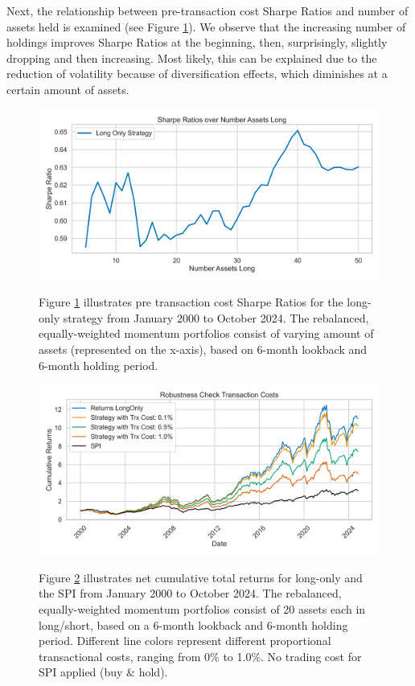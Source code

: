 \documentclass[a4paper,12pt]{article}
\begin{document}
Next, the relationship between pre-transaction cost Sharpe Ratios and number of assets held is examined (see Figure \ref{fig_04}). We observe that the increasing number of holdings improves Sharpe Ratios at the beginning, then, surprisingly, slightly dropping and then increasing. Most likely, this can be explained due to the reduction of volatility because of diversification effects, which diminishes at a certain amount of assets. 
\begin{figure}[htbp]
\centerline{\includegraphics[width=1\textwidth]{figures/rc_number_assets.png}}
\caption{}
\label{fig_04}
\small{{Figure \ref{fig_04} illustrates pre transaction cost Sharpe Ratios for the long-only strategy from January 2000 to October 2024. The rebalanced, equally-weighted momentum portfolios consist of varying amount of assets (represented on the x-axis), based on 6-month lookback and 6-month  holding period.}}
\end{figure}


\begin{figure}[htbp]
\centerline{\includegraphics[width=1\textwidth]{figures/rc_trxCost.png}}
\caption{}
\label{fig_05}
\small{{Figure \ref{fig_05} illustrates net cumulative total returns for long-only and the SPI from January 2000 to October 2024. The rebalanced, equally-weighted momentum portfolios consist of 20 assets each in long/short, based on a 6-month lookback  and 6-month holding period. Different line colors represent different proportional transactional costs, ranging from 0\% to 1.0\%. No trading cost for SPI applied (buy \& hold).}}
\end{figure}
\end{document}
